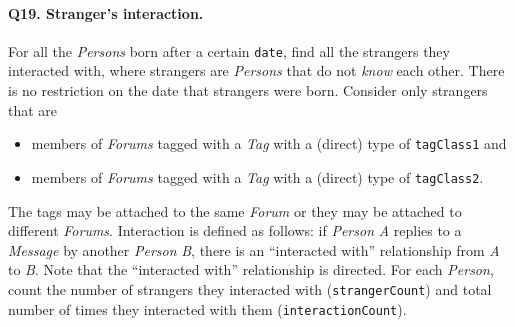 \paragraph{\textbf{Q19}. Stranger's interaction.}
For all the \emph{Persons} born after a certain \texttt{date}, find all
the strangers they interacted with, where strangers are \emph{Persons}
that do not \emph{know} each other. There is no restriction on the date
that strangers were born.
Consider only strangers that are
\begin{itemize}
\tightlist
\item
  members of \emph{Forums} tagged with a \emph{Tag} with a (direct) type
  of \texttt{tagClass1} and
\item
  members of \emph{Forums} tagged with a \emph{Tag} with a (direct) type
  of \texttt{tagClass2}.
\end{itemize}
The tags may be attached to the same \emph{Forum} or they may be
attached to different \emph{Forums}.
Interaction is defined as follows: if \emph{Person} \emph{A} replies to
a \emph{Message} by another \emph{Person} \emph{B}, there is an
``interacted with'' relationship from \emph{A} to \emph{B}. Note that
the ``interacted with'' relationship is directed.
For each \emph{Person}, count the number of strangers they interacted
with (\texttt{strangerCount}) and total number of times they interacted
with them (\texttt{interactionCount}).
